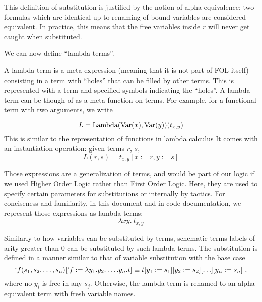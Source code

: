 This definition of substitution is justified by the notion of alpha equivalence: two formulas which are identical up to renaming of bound variables are considered equivalent. In practice, this means that the free variables inside $r$ will never get caught when substituted.

We can now define \enquote{lambda terms}.
\begin{definition}
  A lambda term is a  meta expression (meaning that it is not part of FOL itself) consisting in a term with ``holes'' that can be filled by other terms. This is represented with a term and specified symbols indicating the ``holes''.
  A lambda term can be though of as a meta-function on terms. For example, for a functional term with two arguments, we write

  $$
    L = \operatorname{Lambda}(\operatorname{Var}(x), \operatorname{Var}(y))(t_{x,y})
  $$
  This is similar to the representation of functions in lambda calculus
  It comes with an instantiation operation: given terms $r$, $s$,
  $$L(r, s) = t_{x, y}[x := r, y := s]$$
\end{definition}
Those expressions are a generalization of terms, and would be part of our logic if we used Higher Order Logic rather than First Order Logic. Here, they are used to specify certain parameters for substitutions or internally by tactics. For conciseness and familiarity, in this document and in code documentation, we represent those expressions as lambda terms:
$$\lambda x y.~ t_{x,y}$$

Similarly to how variables can be substituted by terms, schematic terms labels of arity greater than 0 can be substituted by such lambda terms.
The substitution is defined in a manner similar to that of variable substitution with the base case
%
\begin{equation*}
  `f(s_1, s_2, \ldots, s_n)[`f := \lambda y_1.y_2.\ldots.y_n. t] \equiv t[y_1 := s_1][y_2 := s_2][\ldots][y_n := s_n]~,
\end{equation*}
%
where no $y_i$ is free in any $s_j$. Otherwise, the lambda term is renamed to an alpha-equivalent term with fresh variable names.


